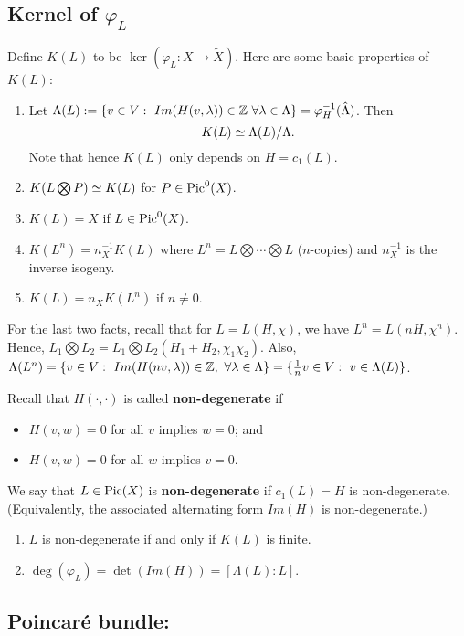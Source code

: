 \subsection{Kernel of $\varphi_L$}
Define $K(L)$ to be $\ker(\varphi_L:X\to \tilde{X})$. Here are some basic properties of $K(L)$:
\begin{enumerate}
\item Let $\Lambda(L):=\{v\in V:\ Im(H(v,\lambda))\in \ZZ\ \forall \lambda\in \Lambda\}=\varphi_H^{-1}(\hat{\Lambda})$. Then 
$$K(L)\simeq \Lambda(L)/\Lambda.$$
Note that hence $K(L)$ only depends on $H=c_1(L)$. 

\item $K(L\bigotimes P)\simeq K(L)$ for $P\in \operatorname{Pic}^0(X)$.
\item $K(L)=X$ if $L\in \operatorname{Pic}^0(X)$.
\item $K(L^n)=n_X^{-1} K(L)$
where $L^n=L\bigotimes \cdots \bigotimes L$ ($n$-copies) and $n_X^{-1}$ is the inverse isogeny.

\item $K(L)=n_X K(L^n)$ if $n\not= 0$. 
\end{enumerate}

For the last two facts, recall that for $L=L(H,\chi)$, we have $L^n=L(nH,\chi^n)$. Hence, $L_1\bigotimes L_2=L_1\bigotimes L_2(H_1+H_2,\chi_1\chi_2)$. Also, $\Lambda(L^n)=\{v\in V:\ Im(H(nv,\lambda))\in \ZZ,\ \forall \lambda\in \Lambda\}=\{\frac{1}{n} v\in V:\ v\in \Lambda(L)\}$. 

Recall that $H(\cdot, \cdot)$ is called \textbf{non-degenerate} if 
\begin{itemize}
\item $H(v,w)=0$ for all $v$ implies $w=0$; and
\item $H(v,w)=0$ for all $w$ implies $v=0$.
\end{itemize}

We say that $L\in \operatorname{Pic}(X)$ is \textbf{non-degenerate} if $c_1(L)=H$ is non-degenerate. (Equivalently, the associated alternating form $Im(H)$ is non-degenerate.) 

\begin{lemma}
\noindent
\begin{enumerate}
\item $L$ is non-degenerate if and only if $K(L)$ is finite.
\item $\deg(\varphi_L)=\det(Im(H))=[\Lambda(L):L]$.
\end{enumerate}
\end{lemma}

\subsection{Poincar\'{e} bundle:}

